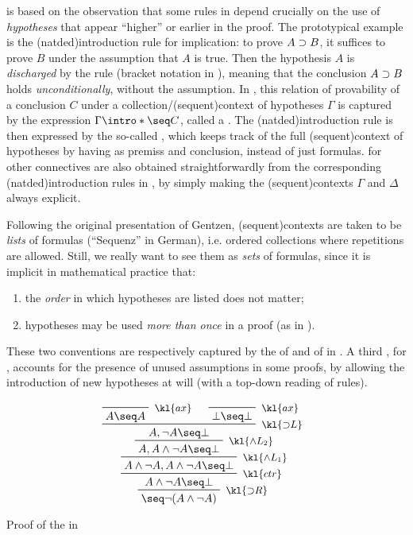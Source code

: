 \AP
{} is based on the observation that some rules in  depend crucially on the use of \emph{hypotheses} that appear
``higher'' or earlier in the proof. The prototypical example is the
\kl(natded){introduction rule}  for implication: to prove $A \supset
B$, it suffices to prove $B$ under the assumption that $A$ is true. Then the
hypothesis $A$ is \emph{discharged} by the rule (bracket notation in
), meaning that the conclusion $A \supset B$ holds
\emph{unconditionally}, without the assumption. In , this
relation of provability of a conclusion $C$ under a
collection/\intro(sequent){context} of hypotheses $\Gamma$ is captured by the
expression $\Gamma \intro*\seq C$, called a . The
\kl(natded){introduction rule}  is then expressed by the so-called
 , which keeps track of the full
\kl(sequent){context} of hypotheses by having  as premiss and
conclusion, instead of just formulas.  for other
connectives are also obtained straightforwardly from the corresponding
\kl(natded){introduction rules} in , by simply making the
\kl(sequent){contexts} $\Gamma$ and $\Delta$ always explicit.

\AP
Following the original presentation of Gentzen, \kl(sequent){contexts} are taken
to be \emph{lists} of formulas (``Sequenz'' in German), i.e. ordered collections
where repetitions are allowed. Still, we really want to see them as \emph{sets}
of formulas, since it is implicit in mathematical practice that:
\begin{enumerate}
\item the \emph{order} in which hypotheses are listed does not matter;
\item hypotheses may be used \emph{more than once} in a proof (as in
).
\end{enumerate}
These two conventions are respectively captured by the 
 of  and  of  in
. A third ,  for
, accounts for the presence of unused assumptions in some
proofs, by allowing the introduction of new hypotheses at will (with a top-down
reading of rules).

\begin{marginfigure}
  $$
  \R[\kl{{\limp}R}]
  {\R[\kl{ctr}]
  {\R[\kl{\land L_1}]
  {\R[\kl{\land L_2}]
  {\R[\kl{{\limp}L}]
    {\R[\kl{ax}]
    {A \seq A}}
    {\R[\kl{ax}]
    {\bot \seq \bot}}
    {A, \neg A \seq \bot}}
  {A, A \land \neg A \seq \bot}}
  {A \land \neg A, A \land \neg A \seq \bot}}
  {A \land \neg A \seq \bot}}
  {\seq \neg (A \land \neg A)}
  $$
  \caption{Proof of the  in }
\end{marginfigure}

